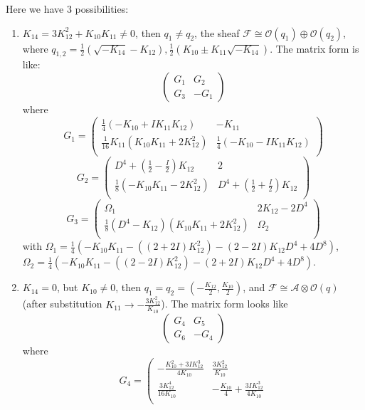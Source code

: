 \documentclass[11pt]{article}
\theoremstyle{definition}
\theoremstyle{plain}
\numberwithin{equation}{section}
\begin{document}
Here we have 3 possibilities:
\begin{enumerate}
	\item $K_{14}=3K_{12}^2+K_{10}K_{11}\neq 0$, then $q_1\neq q_2$, the sheaf $\mathcal{F}\cong\mathcal{O}(q_1)\oplus \mathcal{O}(q_2)$, where $q_{1,2}=\frac{1}{2} (\sqrt{-K_{14}}-K_{12}),\frac{1}{2} (K_{10}\pm K_{11} \sqrt{-K_{14}})$.
	 The matrix form is like:
	$$\begin{pmatrix}
	G_1	& G_2 \\
	G_3	& -G_1
	\end{pmatrix}$$
	where 
	$$
	G_1=\left(
	\begin{array}{cc}
		\frac{1}{4} (-K_{10}+I K_{11} K_{12}) & -K_{11} \\
		\frac{1}{16} K_{11} \left(K_{10} K_{11}+2 K_{12}^2\right) & \frac{1}{4} (-K_{10}-I K_{11} K_{12}) \\
	\end{array}
	\right)
	$$
	$$
	G_2=\left(
	\begin{array}{cc}
		D^4+\left(\frac{1}{2}-\frac{I}{2}\right) K_{12} & 2 \\
		\frac{1}{8} \left(-K_{10} K_{11}-2 K_{12}^2\right) & D^4+\left(\frac{1}{2}+\frac{I}{2}\right) K_{12} \\
	\end{array}
	\right)
	$$
	 $$
	G_3=\left(
	\begin{array}{cc}
	\Omega_1 & 2 K_{12}-2 D^4 \\
		\frac{1}{8} (D^4-K_{12}) \left(K_{10} K_{11}+2 K_{12}^2\right) & \Omega_2 \\
	\end{array}
	\right)
	$$
	with $\Omega_1=\frac{1}{4} \left(-K_{10} K_{11}-\left((2+2 I) K_{12}^2\right)-(2-2 I) K_{12} D^4+4 D^8\right)$,
	\\$\Omega_2=\frac{1}{4} \left(-K_{10} K_{11}-\left((2-2 I) K_{12}^2\right)-(2+2 I) K_{12} D^4+4 D^8\right)$.
	\item $K_{14}=0$, but $K_{10}\neq 0$, then $q_1=q_2=(-\frac{K_{12}}{2},\frac{K_{10}}{2})$, and $\mathcal{F}\cong \mathcal{A}\otimes \mathcal{O}(q)$ (after substitution $K_{11}\rightarrow -\frac{3K_{12}^2}{K_{10}}$). The matrix form looks like
	$$\begin{pmatrix}
		G_4	& G_5 \\
		G_6	& -G_4
	\end{pmatrix}$$
	where 
	$$
	G_4=\left(
	\begin{array}{cc}
		-\frac{K_{10}^2+3 I K_{12}^3}{4 K_{10}} & \frac{3 K_{12}^2}{K_{10}} \\
		\frac{3 K_{12}^4}{16 K_{10}} & -\frac{K_{10}}{4}+\frac{3 I K_{12}^3}{4 K_{10}} \\

\end{array}$$
\end{enumerate}
\end{document}
